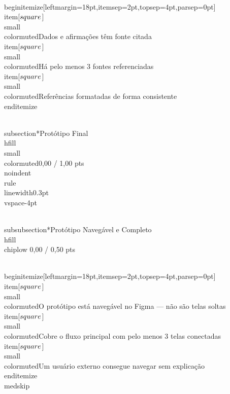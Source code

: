 \documentclass[11pt, a4paper]{article}
\newcommand{\chiplow}[1]{\colorbox{crimsondim}{\color{crimson}\semibold\small\strut\ #1\ }}
\begin{document}
\\begin{itemize}[leftmargin=18pt,itemsep=2pt,topsep=4pt,parsep=0pt]
  \\item[$\\square$] {\\small\\color{muted}Dados e afirmações têm fonte citada}
  \\item[$\\square$] {\\small\\color{muted}Há pelo menos 3 fontes referenciadas}
  \\item[$\\square$] {\\small\\color{muted}Referências formatadas de forma consistente}
\\end{itemize}

\\subsection*{Protótipo Final \\hfill {\\small\\color{muted}0,00 / 1,00 pts}}
\\noindent\\rule{\\linewidth}{0.3pt}\\vspace{-4pt}

\\subsubsection*{Protótipo Navegável e Completo \\hfill {\\chiplow 0,00 / 0,50 pts}}

\\begin{itemize}[leftmargin=18pt,itemsep=2pt,topsep=4pt,parsep=0pt]
  \\item[$\\square$] {\\small\\color{muted}O protótipo está navegável no Figma — não são telas soltas}
  \\item[$\\square$] {\\small\\color{muted}Cobre o fluxo principal com pelo menos 3 telas conectadas}
  \\item[$\\square$] {\\small\\color{muted}Um usuário externo consegue navegar sem explicação}
\\end{itemize}
\\medskip
\end{document}
